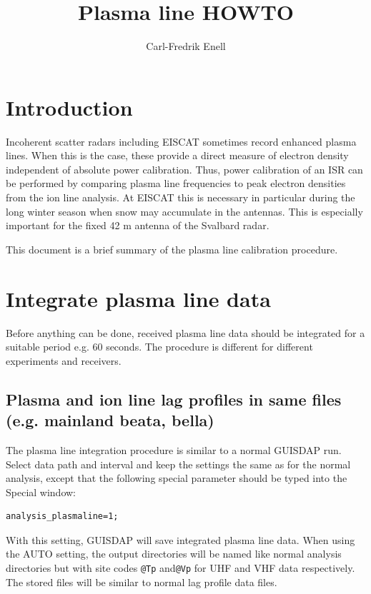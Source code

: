 \documentclass[a4]{article}
\title{Plasma line HOWTO}
\author{Carl-Fredrik Enell}
\begin{document}
\pagestyle{empty}

\maketitle{}
\thispagestyle{empty}

\section{Introduction}
\label{sec:introduction}

Incoherent scatter radars including EISCAT sometimes record enhanced
plasma lines. When this is the case, these provide a direct measure of
electron density independent of absolute power calibration.  Thus,
power calibration of an ISR can be performed by comparing plasma line
frequencies to peak electron densities from the ion line analysis.  At
EISCAT this is necessary in particular during the long winter season
when snow may accumulate in the antennas. This is especially important
for the fixed 42 m antenna of the Svalbard radar.

This document is a brief summary of the plasma line calibration procedure.



\section{Integrate plasma line data}
\label{sec:integr-plasma-line}

Before anything can be done, received plasma line data should be
integrated for a suitable period e.g. 60 seconds. The procedure is
different for different experiments and receivers.


\subsection{Plasma and ion line lag profiles in same files (e.g. mainland beata, bella)}
\label{sec:plasma-ion-lines}

The plasma line integration procedure is similar to a normal GUISDAP
run. Select data path and interval and keep the settings the same as
for the normal analysis, except that the following special parameter
should be typed into the Special window:

\begin{verbatim}
analysis_plasmaline=1;
\end{verbatim}

With this setting, GUISDAP will save integrated plasma line data.
When using the AUTO setting, the output directories will be named like
normal analysis directories but with site codes \texttt{@Tp}
and\texttt{@Vp} for UHF and VHF data respectively. The stored files
will be similar to normal lag profile data files.
\end{document}
